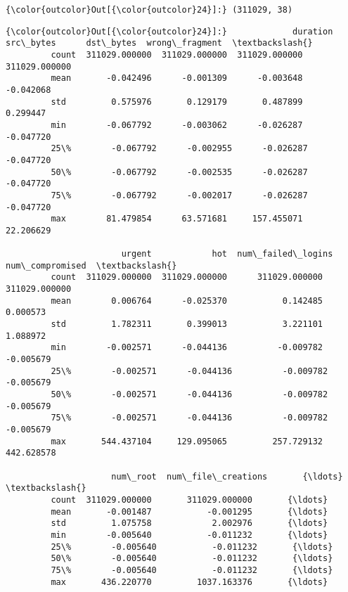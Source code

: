 \documentclass[11pt]{article}
\begin{document}
\begin{Verbatim}[commandchars=\\\{\}]
{\color{outcolor}Out[{\color{outcolor}24}]:} (311029, 38)
\end{Verbatim}
            
\begin{Verbatim}[commandchars=\\\{\}]
{\color{outcolor}Out[{\color{outcolor}24}]:}             duration      src\_bytes      dst\_bytes  wrong\_fragment  \textbackslash{}
         count  311029.000000  311029.000000  311029.000000   311029.000000   
         mean       -0.042496      -0.001309      -0.003648       -0.042068   
         std         0.575976       0.129179       0.487899        0.299447   
         min        -0.067792      -0.003062      -0.026287       -0.047720   
         25\%        -0.067792      -0.002955      -0.026287       -0.047720   
         50\%        -0.067792      -0.002535      -0.026287       -0.047720   
         75\%        -0.067792      -0.002017      -0.026287       -0.047720   
         max        81.479854      63.571681     157.455071       22.206629   
         
                       urgent            hot  num\_failed\_logins  num\_compromised  \textbackslash{}
         count  311029.000000  311029.000000      311029.000000    311029.000000   
         mean        0.006764      -0.025370           0.142485         0.000573   
         std         1.782311       0.399013           3.221101         1.088972   
         min        -0.002571      -0.044136          -0.009782        -0.005679   
         25\%        -0.002571      -0.044136          -0.009782        -0.005679   
         50\%        -0.002571      -0.044136          -0.009782        -0.005679   
         75\%        -0.002571      -0.044136          -0.009782        -0.005679   
         max       544.437104     129.095065         257.729132       442.628578   
         
                     num\_root  num\_file\_creations       {\ldots}        \textbackslash{}
         count  311029.000000       311029.000000       {\ldots}         
         mean       -0.001487           -0.001295       {\ldots}         
         std         1.075758            2.002976       {\ldots}         
         min        -0.005640           -0.011232       {\ldots}         
         25\%        -0.005640           -0.011232       {\ldots}         
         50\%        -0.005640           -0.011232       {\ldots}         
         75\%        -0.005640           -0.011232       {\ldots}         
         max       436.220770         1037.163376       {\ldots}         
         

\end{Verbatim}
\end{document}
